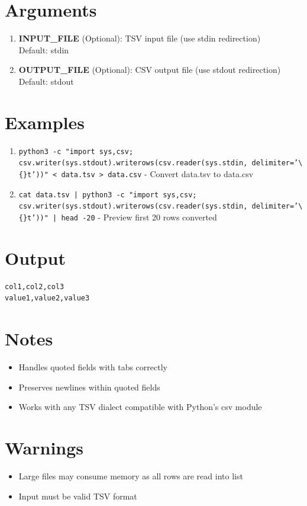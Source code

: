 \documentclass[openany]{book}
\begin{document}
\section*{Arguments}
\begin{enumerate}
  \item \textbf{INPUT\_FILE} (Optional): TSV input file (use stdin redirection) \\ Default: stdin
  \item \textbf{OUTPUT\_FILE} (Optional): CSV output file (use stdout redirection) \\ Default: stdout
\end{enumerate}

\section*{Examples}
\begin{enumerate}
  \item \texttt{python3 -c "import sys,csv; csv.writer(sys.stdout).writerows(csv.reader(sys.stdin, delimiter='\textbackslash\{\}t'))" < data.tsv > data.csv} - Convert data.tsv to data.csv
  \item \texttt{cat data.tsv | python3 -c "import sys,csv; csv.writer(sys.stdout).writerows(csv.reader(sys.stdin, delimiter='\textbackslash\{\}t'))" | head -20} - Preview first 20 rows converted
\end{enumerate}

\section*{Output}
\begin{lstlisting}
col1,col2,col3
value1,value2,value3

\end{lstlisting}

\section*{Notes}
\begin{itemize}
  \item Handles quoted fields with tabs correctly
  \item Preserves newlines within quoted fields
  \item Works with any TSV dialect compatible with Python's csv module
\end{itemize}

\section*{Warnings}
\begin{itemize}
  \item Large files may consume memory as all rows are read into list
  \item Input must be valid TSV format
\end{itemize}
\end{document}
